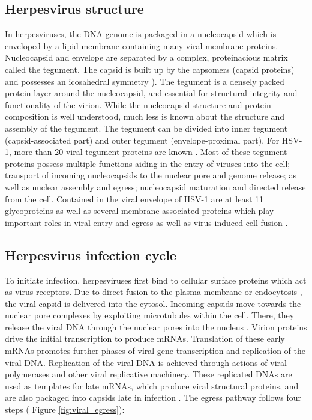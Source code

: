 \pagebreak

\subsection{Herpesvirus structure}
In herpesviruses, the DNA genome is packaged in a nucleocapsid which is enveloped by a lipid membrane containing many viral membrane proteins.
Nucleocapsid and envelope are separated by a complex, proteinacious matrix called the tegument.
The capsid is built up by the capsomers (capsid proteins) and possesses an icosahedral symmetry \cite{[4]}).
The tegument is a densely packed protein layer around the nucleocapsid, and essential for structural integrity and functionality of the virion.
While the nucleocapsid structure and protein composition is well understood, much less is known about the structure and assembly of the tegument.
The tegument can be divided into inner tegument (capsid-associated part) and outer tegument (envelope-proximal part).
For HSV-1, more than 20 viral tegument proteins are known \cite{[5, 6]}.
Most of these tegument proteins possess multiple functions aiding in the entry of viruses into the cell; transport of incoming nucleocapsids to the nuclear pore and genome release; as well as nuclear assembly and egress; nucleocapsid maturation and directed release from the cell.
Contained in the viral envelope of HSV-1 are at least 11 glycoproteins as well as several membrane-associated proteins which play important roles in viral entry and egress as well as virus-induced cell fusion \cite{[2, 7]}.

\subsection{Herpesvirus infection cycle}
To initiate infection, herpesviruses first bind to cellular surface proteins which act as virus receptors.
Due to direct fusion to the plasma membrane or endocytosis \cite{[8]}, the viral capsid is delivered into the cytosol.
Incoming capsids move towards the nuclear pore complexes by exploiting microtubules within the cell\cite{[9, 10]}.
There, they release the viral DNA through the nuclear pores into the nucleus \cite{[11]}.
Virion proteins drive the initial transcription to produce %
mRNAs.
Translation of these early mRNAs promotes further phases of viral gene transcription and replication of the viral DNA.
Replication of the viral DNA is achieved through actions of viral polymerases and other viral replicative machinery.
These replicated DNAs are used as templates for late mRNAs, which produce viral structural proteins, and are also packaged into capsids late in infection \cite{[4]}.
The egress pathway follows four steps (%
Figure \ref{fig:viral_egress}):

